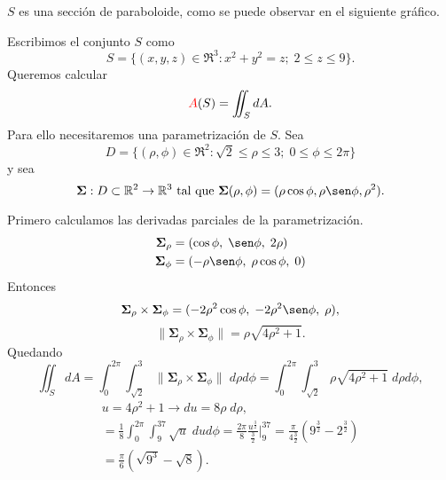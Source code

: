\begin{solution}
  $S$ es una secci\'on de paraboloide, como se puede observar en el siguiente gr\'afico.

  \begin{center}
  \end{center}

  Escribimos el conjunto $S$ como
  \[
    S=\{(x,y,z)\in \Re^3: x^2+y^2=z;\;2\leq z\leq 9 \}.
  \]
  Queremos calcular \[ \textcolor{red}{A}(S) = \iint_S dA.\]
  Para ello necesitaremos una parametrizaci\'on de $S$. Sea
  $$D=\{(\rho, \phi) \in\Re^2:    \sqrt{2}\leq \rho \leq 3;\;0\leq  \phi \leq 2\pi \}$$  y  sea  $$\boldsymbol{\Sigma}:D \subset\Re^2\to\Re^3  \mbox{ tal que }   \boldsymbol{\Sigma}(\rho, \phi)=(\rho \cos\phi, \rho \sen\phi , \rho^{2}).$$

  Primero calculamos las derivadas parciales de la parametrizaci\'on.
  \begin{align*}
    \boldsymbol{\Sigma}_{\rho} & =(\cos \phi,\;\sen \phi,\; 2\rho)         \\
    \boldsymbol{\Sigma}_\phi   & =(  -\rho \sen \phi,\;\rho \cos \phi,\;0)
  \end{align*}
  Entonces
  $$
    \boldsymbol{\Sigma}_{\rho} \times\boldsymbol{\Sigma}_\phi =
    (-2\rho^2 \cos\phi  , \;-2\rho^2 \sen \phi, \;\rho),
  $$
  $$\|  \boldsymbol{\Sigma}_{\rho} \times\boldsymbol{\Sigma}_\phi\|
    = \rho\sqrt{4\rho^2+1}.$$
  Quedando
  \begin{equation}
    \iint_S dA
    = \int_0^{2\pi} \int_{\sqrt{2}}^3 \|\boldsymbol{\Sigma}_{\rho}
    \times\boldsymbol{\Sigma}_\phi \| \; d\rho d\phi
    = \int_0^{2\pi} \int_{\sqrt{2}}^3 \rho\sqrt{4\rho^2+1}\;d\rho d\phi,
    \label{eq:integral1}
  \end{equation}
  \begin{gather*}
  u=4\rho^2+1 \rightarrow du = 8\rho\;d\rho, 
  \\[.2cm]
  = \frac{1}{8}\int_0^{2\pi} \int_9^{37} \sqrt{u}\;du d\phi
  = \frac{2\pi}{8}\frac{u^{\frac{3}{2}}}{\frac{3}{2}}\Bigg|_9^37
  = \frac{\pi}{4\frac{3}{2}} (9^{\frac{3}{2}} - 2^{\frac{3}{2}}) 
  \\[.2cm]
  = \frac{\pi}{6} (\sqrt{9^3} - \sqrt{8}).
  \end{gather*}
\end{solution}

